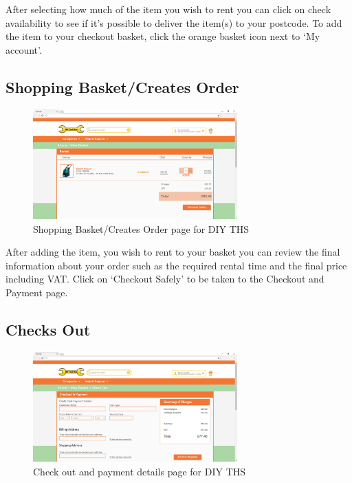 After selecting how much of the item you wish to rent you can click on
check availability to see if it's possible to deliver the item(s) to
your postcode. To add the item to your checkout basket, click the orange
basket icon next to `My account'.

\hypertarget{shopping-basketcreates-order}{%
\subsection{Shopping Basket/Creates
Order}\label{shopping-basketcreates-order}}

\begin{figure}[H]
      \centering
      \includegraphics[trim = 0 0 0 0, clip, width=0.7\textwidth]{TempImg/basket.png}
      \caption{Shopping Basket/Creates Order page for DIY THS}
 \end{figure}

After adding the item, you wish to rent to your basket you can review
the final information about your order such as the required rental time
and the final price including VAT. Click on `Checkout Safely' to be
taken to the Checkout and Payment page.

\hypertarget{checks-out}{%
\subsection{Checks Out}\label{checks-out}}

\begin{figure}[H]
      \centering
      \includegraphics[trim = 0 0 0 0, clip, width=0.7\textwidth]{TempImg/checkoutpic.png}
      \caption{Check out and payment details page for DIY THS}
 \end{figure}

